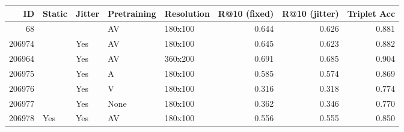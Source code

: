 \begin{tabular}{rllllrrr}
\toprule
    ID & Static & Jitter & Pretraining & Resolution &  R@10 (fixed) &  R@10 (jitter) &  Triplet Acc \\
\midrule
    68 &        &        &          AV &    180x100 &         0.644 &          0.626 &        0.881 \\
206974 &        &    Yes &          AV &    180x100 &         0.645 &          0.623 &        0.882 \\
206964 &        &    Yes &          AV &    360x200 &         0.691 &          0.685 &        0.904 \\
206975 &        &    Yes &           A &    180x100 &         0.585 &          0.574 &        0.869 \\
206976 &        &    Yes &           V &    180x100 &         0.316 &          0.318 &        0.774 \\
206977 &        &    Yes &        None &    180x100 &         0.362 &          0.346 &        0.770 \\
206978 &    Yes &    Yes &          AV &    180x100 &         0.556 &          0.555 &        0.850 \\
\bottomrule
\end{tabular}
